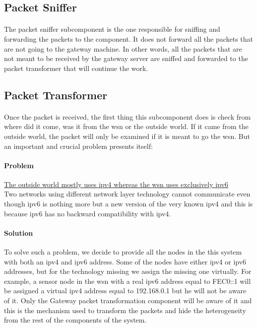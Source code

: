 \documentclass[oneside,12pt,a4paper,final]{book}
\begin{document}
\subsection{Packet Sniffer}
\paragraph{}
The packet sniffer subcomponent is the one responsible for sniffing and forwarding the packets to the component. It does not forward all the packets that are not going to the gateway machine. In other words, all the packets that are not meant to be received by the gateway server are sniffed and forwarded to the packet transformer that will continue the work.
\subsection{Packet Transformer}
\paragraph{}
Once the packet is received, the first thing this subcomponent does is check from where did it come, was it from the \gls{wsn} or the outside world. If it came from the outside world, the packet will only be examined if it is meant to go the \gls{wsn}. But an important and crucial problem presents itself:
\paragraph{Problem}
\underline{The outside world mostly uses \gls{ipv4} whereas the \gls{wsn} uses exclusively \gls{ipv6}} \\
Two networks using different network layer technology cannot communicate even though \gls{ipv6} is nothing more but a new version of the very known \gls{ipv4} and this is because \gls{ipv6} has no backward compatibility with \gls{ipv4}.
\paragraph{Solution}
To solve such a problem, we decide to provide all the nodes in the this system with both an \gls{ipv4} and \gls{ipv6} address. Some of the nodes have either \gls{ipv4} or \gls{ipv6} addresses, but for the technology missing we assign the missing one virtually. For example, a sensor node in the \gls{wsn} with a real \gls{ipv6} address equal to FEC0::1 will be assigned a virtual \gls{ipv4} address equal to 192.168.0.1 but he will not be aware of it. Only the Gateway packet transformation component will be aware of it and this is the mechanism used to transform the packets and hide the heterogeneity from the rest of the components of the system.
\end{document}
